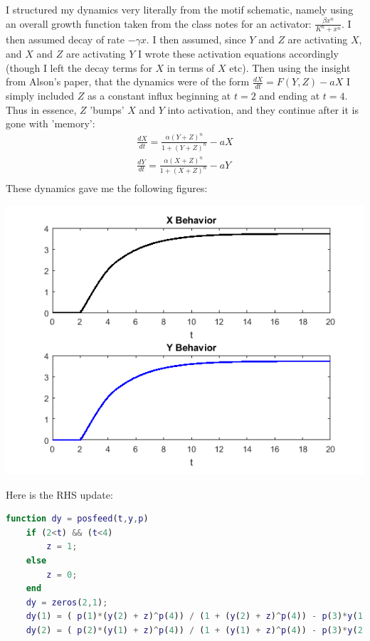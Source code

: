 \documentclass{article}
\begin{document}
 I structured my dynamics very literally from the motif schematic, namely using an overall growth function taken from the class notes for an activator: $\frac{\beta x^n}{K^n + x^n}$. I then assumed decay of rate $-\gamma x$. I then assumed, since $Y$ and $Z$ are activating $X$, and $X$ and $Z$ are activating $Y$ I wrote these activation equations accordingly (though I left the decay terms for $X$ in terms of $X$ etc). Then using the insight from Alson's paper, that the dynamics were of the form $\frac{dX}{dt} = F(Y,Z) - aX$ I simply included $Z$ as a constant influx beginning at $t=2$ and ending at $t=4$. Thus in essence, $Z$ 'bumps' $X$ and $Y$ into activation, and they continue after it is gone with 'memory':
\begin{equation}
\begin{aligned}
\frac{dX}{dt} = \frac{\alpha (Y+Z)^n}{1 + (Y+Z)^n} - aX\\
\frac{dY}{dt} = \frac{\alpha (X+Z)^n}{1 + (X+Z)^n} - aY\\
\end{aligned}
\end{equation}
These dynamics gave me the following figures:
\begin{center}
    \includegraphics[scale = 1]{7a.png}
\end{center}
Here is the RHS update:
\begin{lstlisting}[language=Matlab]
function dy = posfeed(t,y,p)
    if (2<t) && (t<4)
        z = 1;
    else
        z = 0;
    end
    dy = zeros(2,1);
    dy(1) = ( p(1)*(y(2) + z)^p(4)) / (1 + (y(2) + z)^p(4)) - p(3)*y(1); 
    dy(2) = ( p(2)*(y(1) + z)^p(4)) / (1 + (y(1) + z)^p(4)) - p(3)*y(2);
\end{lstlisting}
\end{document}

